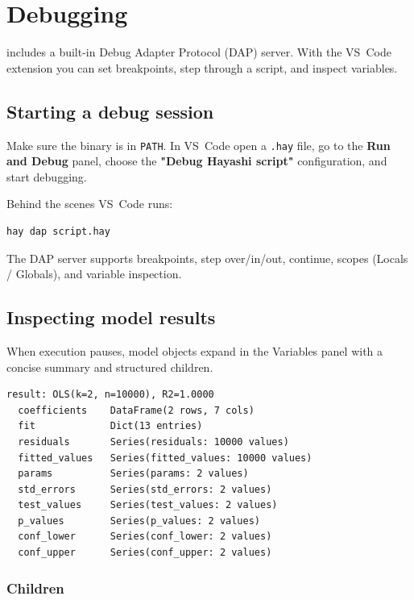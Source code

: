 \chapter{Debugging}

\hayashi{} includes a built-in Debug Adapter Protocol (DAP) server. With the VS~Code extension you can set breakpoints, step through a script, and inspect variables.

\section{Starting a debug session}

Make sure the \hay{} binary is in \texttt{PATH}. In VS~Code open a \texttt{.hay} file, go to the \textbf{Run and Debug} panel, choose the \textbf{"Debug Hayashi script"} configuration, and start debugging.

Behind the scenes VS~Code runs:

\begin{lstlisting}[style=inline, language=sh]
hay dap script.hay
\end{lstlisting}

The DAP server supports breakpoints, step over/in/out, continue, scopes (Locals / Globals), and variable inspection.

\section{Inspecting model results}

When execution pauses, model objects expand in the Variables panel with a concise summary and structured children.

\begin{lstlisting}[style=inline]
result: OLS(k=2, n=10000), R2=1.0000
  coefficients    DataFrame(2 rows, 7 cols)
  fit             Dict(13 entries)
  residuals       Series(residuals: 10000 values)
  fitted_values   Series(fitted_values: 10000 values)
  params          Series(params: 2 values)
  std_errors      Series(std_errors: 2 values)
  test_values     Series(test_values: 2 values)
  p_values        Series(p_values: 2 values)
  conf_lower      Series(conf_lower: 2 values)
  conf_upper      Series(conf_upper: 2 values)
\end{lstlisting}

\subsection{Children}

